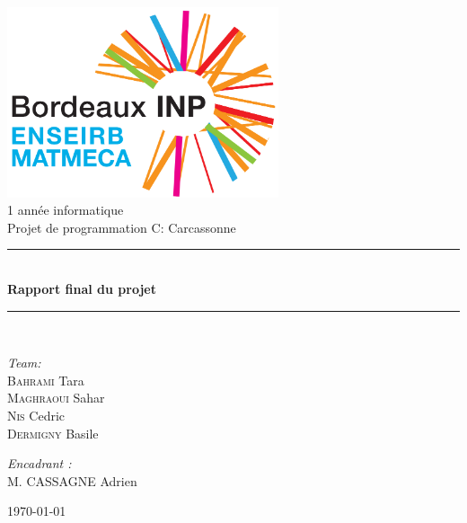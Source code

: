\begin{titlepage}
\begin{center}
\includegraphics[width=0.6\textwidth]{logo.png}\\[1cm]
{\large 1 année informatique}\\[1cm]
{\large Projet de programmation C: Carcassonne}\\[1cm]
\rule{\linewidth}{0.5mm} \\[0.4cm]
{ \huge \bfseries Rapport final du projet  \\[0.4cm] }
\rule{\linewidth}{0.5mm} \\[1.5cm]
\noindent
\begin{minipage}{0.4\textwidth}
  \begin{flushleft} \large
    \emph{Team:}\\
    \textsc{Bahrami} Tara  \\
    \textsc{Maghraoui} Sahar\\
    \textsc {Nis} Cedric \\
    \textsc {Dermigny} Basile \\
  \end{flushleft}
\end{minipage}%
\begin{minipage}{0.4\textwidth}
  \begin{flushright} \large
    \emph{Encadrant :} \\
    M. \textsc{CASSAGNE} {Adrien} \\
    \textsc{}
  \end{flushright}
\end{minipage}
\vfill
{\large  \today}
\end{center}
\end{titlepage}